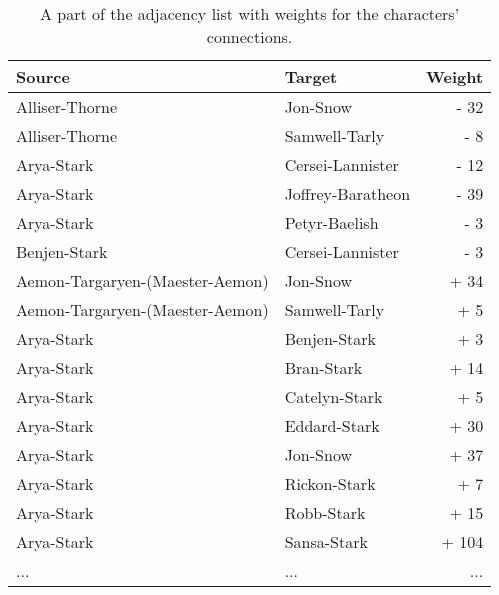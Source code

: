 \begin{table}[h!]
\centering
 \begin{tabular}{llr}
 \toprule
\textbf{Source}	&	\textbf{Target}	&	\textbf{Weight}	\\
\midrule
    Alliser-Thorne	&	Jon-Snow	&	-	32	\\
    Alliser-Thorne	&	Samwell-Tarly	&	-	8	\\
    Arya-Stark	&	Cersei-Lannister	&	-	12	\\
    Arya-Stark	&	Joffrey-Baratheon	&	-	39	\\
    Arya-Stark	&	Petyr-Baelish	&	-	3	\\
    Benjen-Stark	&	Cersei-Lannister	&	-	3	\\
    Aemon-Targaryen-(Maester-Aemon)	&	Jon-Snow	&	+	34	\\
    Aemon-Targaryen-(Maester-Aemon)	&	Samwell-Tarly	&	+	5	\\
    Arya-Stark	&	Benjen-Stark	&	+	3	\\
    Arya-Stark	&	Bran-Stark	&	+	14	\\
    Arya-Stark	&	Catelyn-Stark	&	+	5	\\
    Arya-Stark	&	Eddard-Stark	&	+	30	\\
    Arya-Stark	&	Jon-Snow	&	+	37	\\
    Arya-Stark	&	Rickon-Stark	&	+	7	\\
    Arya-Stark	&	Robb-Stark	&	+	15	\\
    Arya-Stark	&	Sansa-Stark	&	+	104	\\
    ... & ... & ...\\
 \bottomrule
\end{tabular}
\caption{A part of the adjacency list with weights for the characters' connections.}
\label{table:data}
\end{table}
